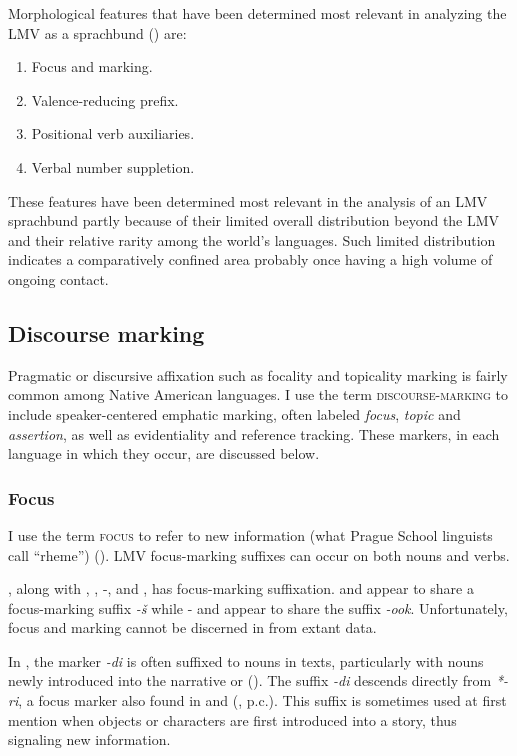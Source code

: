 \documentclass[output=paper]{LSP/langsci}
\begin{document}
	Morphological features that have been determined most relevant in analyzing the LMV as a sprachbund (\citealt[3]{Kaufman2014}) are:

\begin{enumerate}
\item{Focus and  marking.}
\item{Valence-reducing prefix.}
\item{Positional verb auxiliaries.}
\item{Verbal number suppletion.}
\end{enumerate}
 
These features have been determined most relevant in the analysis of an LMV sprachbund partly because of their limited overall distribution beyond the LMV and their relative rarity among the world’s languages. Such limited distribution indicates a comparatively confined area probably once having a high volume of ongoing contact.

\subsection{Discourse marking}

Pragmatic or discursive affixation such as focality and topicality marking is fairly common among Native American languages. I use the term \textsc{discourse-marking} to include speaker-centered emphatic marking, often labeled \emph{focus}, \emph{topic} and \emph{assertion}, as well as evidentiality and reference tracking. These markers, in each language in which they occur, are discussed below.

\subsubsection{Focus}
	
I use the term \textsc{focus} to refer to new information (what Prague School linguists call “rheme”) (\citealt[271]{Payne1997}). LMV focus-marking suffixes can occur on both nouns and verbs.

	, along with , , -, and , has focus-marking suffixation.  and  appear to share a focus-marking suffix \emph{-š} while - and  appear to share the suffix \emph{-ook}. Unfortunately, focus and  marking cannot be discerned in  from extant data.

In , the marker \emph{-di} is often suffixed to nouns in texts, particularly with nouns newly introduced into the narrative or  (\citealt[3]{Kaufman2011}). The suffix \emph{-di} descends directly from  \emph{*-ri}, a focus marker also found in  and  (\citealt[3]{Boyle2007}, p.c.). This suffix is sometimes used at first mention when objects or characters are first introduced into a story, thus signaling new information. 
\end{document}
